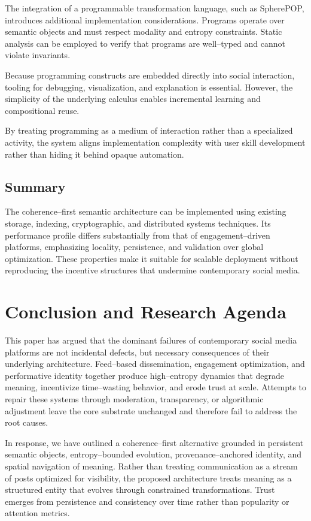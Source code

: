 \documentclass[11pt]{article}
\begin{document}
The integration of a programmable transformation language, such as SpherePOP, introduces
additional implementation considerations. Programs operate over semantic objects and must
respect modality and entropy constraints. Static analysis can be employed to verify that
programs are well--typed and cannot violate invariants.

Because programming constructs are embedded directly into social interaction, tooling for
debugging, visualization, and explanation is essential. However, the simplicity of the
underlying calculus enables incremental learning and compositional reuse.

By treating programming as a medium of interaction rather than a specialized activity,
the system aligns implementation complexity with user skill development rather than
hiding it behind opaque automation.

\subsection{Summary}

The coherence--first semantic architecture can be implemented using existing storage,
indexing, cryptographic, and distributed systems techniques. Its performance profile
differs substantially from that of engagement--driven platforms, emphasizing locality,
persistence, and validation over global optimization. These properties make it suitable
for scalable deployment without reproducing the incentive structures that undermine
contemporary social media.

\section{Conclusion and Research Agenda}

This paper has argued that the dominant failures of contemporary social media platforms
are not incidental defects, but necessary consequences of their underlying architecture.
Feed--based dissemination, engagement optimization, and performative identity together
produce high--entropy dynamics that degrade meaning, incentivize time--wasting behavior,
and erode trust at scale. Attempts to repair these systems through moderation, transparency,
or algorithmic adjustment leave the core substrate unchanged and therefore fail to address
the root causes.

In response, we have outlined a coherence--first alternative grounded in persistent
semantic objects, entropy--bounded evolution, provenance--anchored identity, and spatial
navigation of meaning. Rather than treating communication as a stream of posts optimized
for visibility, the proposed architecture treats meaning as a structured entity that
evolves through constrained transformations. Trust emerges from persistence and
consistency over time rather than popularity or attention metrics.
\end{document}
